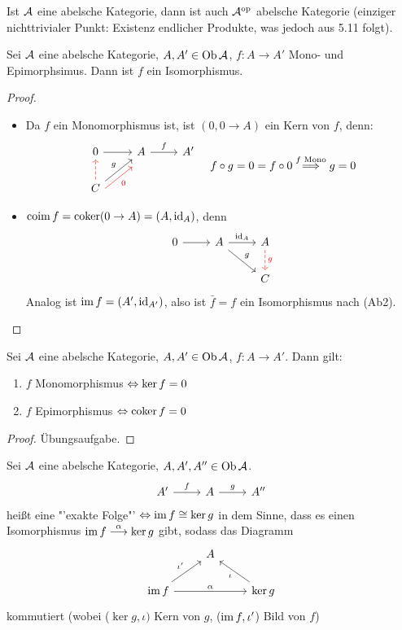 \begin{anm}
	Ist $\mathcal{A}$ eine abelsche Kategorie, dann ist auch $\mathcal{A}^\text{op}$ abelsche Kategorie (einziger nichttrivialer Punkt: Existenz endlicher Produkte, was jedoch aus 5.11 folgt).
\end{anm}
\begin{sa}
	Sei $\mathcal{A}$ eine abelsche Kategorie, $A,A' \in \text{Ob}\,\mathcal{A}$, $f:A \to A'$ Mono- und Epimorphsimus. Dann ist $f$ ein Isomorphismus.
\end{sa}
\begin{proof}
	\begin{itemize}
		\item Da $f$ ein Monomorphismus ist, ist $(0, 0 \to A)$ ein Kern von $f$, denn: 
		$$ \begin{tikzcd}
		0 \arrow{r} & A \arrow{r}{f} & A' \\
		C \arrow[dashed, red]{u}\arrow{ur}{g} \arrow[swap, red, yshift = -1.5ex]{ur}{0}& & 
		\end{tikzcd} \quad f\circ g = 0 = f \circ 0 \overset{f \text{ Mono}}{\Longrightarrow} g=0
		$$
		\item $\operatorname{coim} f = \operatorname{coker}(0 \to A) = (A, \operatorname{id}_A)$, denn 
		$$\begin{tikzcd}
		0 \arrow{r} & A \arrow{dr}{g} \arrow{r}{\id_A} & A \arrow[red, dashed]{d}{g}\\
		& & C
		\end{tikzcd}
		$$
		Analog ist $\operatorname{im} f = (A', \operatorname{id}_{A'})$, also ist $\bar f = f $ ein Isomorphismus nach (Ab2).
	\end{itemize}
\end{proof}
\begin{bem}
	Sei $\mathcal{A}$ eine abelsche Kategorie, $A,A' \in \text{Ob}\,\mathcal{A}$, $f:A \to A'$. Dann gilt:
	\begin{enumerate}[label= \alph*)]
		\item $f$ Monomorphismus $\Leftrightarrow \ker f =0$
		\item $f$ Epimorphismus $\Leftrightarrow \operatorname{coker} f = 0$
	\end{enumerate}
\end{bem}
\begin{proof}
	Übungsaufgabe.
\end{proof}
\begin{df}
	Sei $\mathcal{A}$ eine abelsche Kategorie, $A,A', A''\in \text{Ob}\,\mathcal{A}$.
	$$\begin{tikzcd}
	A' \arrow{r}{f} & A \arrow{r}{g} & A''
	\end{tikzcd}$$
	heißt eine "'exakte Folge"' $\Leftrightarrow \operatorname{im} f \cong \ker g$ in dem Sinne, dass es einen Isomorphismus
	$\operatorname{im} f \overset{\alpha}{\longrightarrow} \ker g$ gibt, sodass das Diagramm
	$$\begin{tikzcd}
	& A & \\
	\im f \arrow{ur}{\iota'} \arrow{rr}{\alpha} & & \ker g \arrow{ul}{\iota}
	\end{tikzcd}$$
	kommutiert (wobei ($\ker g, \iota)$ Kern von $g$, ($\operatorname{im} f, \iota'$) Bild von $f$)
\end{df}
